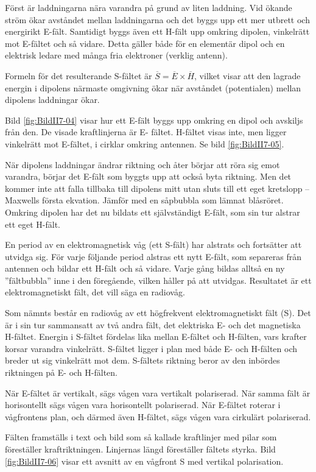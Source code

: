 Först är laddningarna nära varandra på grund av liten laddning.
Vid ökande ström ökar avståndet mellan laddningarna och det byggs upp ett
mer utbrett och energirikt E-fält.
Samtidigt byggs även ett H-fält upp omkring dipolen, vinkelrätt mot E-fältet
och så vidare.
Detta gäller både för en elementär dipol och en elektrisk ledare med många fria
elektroner (verklig antenn).

Formeln för det resulterande S-fältet är \(\overline{S} =
\overline{E}\times\overline{H}\), vilket visar att den lagrade energin
i dipolens närmaste omgivning ökar när avståndet (potentialen) mellan
dipolens laddningar ökar.

Bild \ref{fig:BildII7-04} visar hur ett E-fält byggs upp omkring en dipol och
avskiljs från den.
De visade kraftlinjerna är E- fältet.
H-fältet visas inte, men ligger vinkelrätt mot E-fältet, i cirklar omkring
antennen. Se bild \ref{fig:BildII7-05}.



När dipolens laddningar ändrar riktning och åter börjar att röra sig
emot varandra, börjar det E-fält som byggts upp att också byta riktning.
Men det kommer inte att falla tillbaka till dipolens mitt
utan sluts till ett eget kretslopp -- Maxwells första ekvation.
Jämför med en såpbubbla som lämnat blåsröret.
Omkring dipolen har det nu bildats ett självständigt E-fält, som sin tur
alstrar ett eget H-fält.

En period av en elektromagnetisk våg (ett S-fält) har alstrats och
fortsätter att utvidga sig.
För varje följande period alstras ett nytt E-fält, som separeras från antennen
och bildar ett H-fält och så vidare.
Varje gång bildas alltså en ny ''fältbubbla'' inne i den föregående, vilken
håller på att utvidgas.
Resultatet är ett elektromagnetiskt fält, det vill säga en radiovåg.

Som nämnts består en radiovåg av ett högfrekvent elektromagnetiskt fält (S).
Det är i sin tur sammansatt av två andra fält, det elektriska E-
och det magnetiska H-fältet.
Energin i S-fältet fördelas lika mellan E-fältet och H-fälten,
vars krafter korsar varandra vinkelrätt.
S-fältet ligger i plan med både E- och H-fälten och breder ut sig vinkelrätt
mot dem.
S-fältets riktning beror av den inbördes riktningen på E- och H-fälten.

När E-fältet är vertikalt, sägs vågen vara vertikalt polariserad.
När samma fält är horisontellt sägs vågen vara horisontellt polariserad.
När E-fältet roterar i vågfrontens plan, och därmed även H-fältet, sägs vågen
vara cirkulärt polariserad.

Fälten framställs i text och bild som så kallade kraftlinjer med pilar som
föreställer kraftriktningen.
Linjernas längd föreställer fältets styrka.
Bild \ref{fig:BildII7-06} visar ett avsnitt av en vågfront S med vertikal
polarisation.

